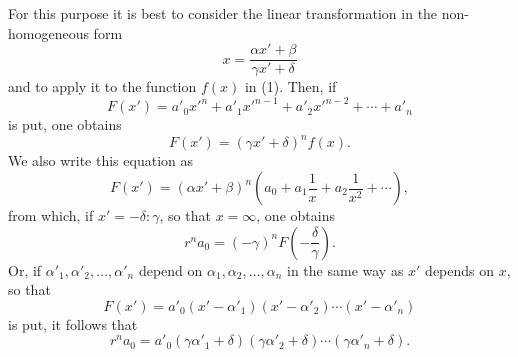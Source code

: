 \documentclass[11pt]{article}
\begin{document}
For this purpose it is best to consider the linear transformation in the non-homogeneous form
\begin{equation}
 x=\frac{\alpha x'+\beta}{\gamma x'+\delta}
\tag{15}
\end{equation}
and to apply it to the function $f(x)$ in (1). Then, if
\[
 F(x')=a'_0x'^n+a'_1x'^{n-1}+a'_2x'^{n-2}+\cdots+a'_n
\]
is put, one obtains
\begin{equation}
 F(x')=(\gamma x'+\delta)^n f(x).
\tag{16}
\end{equation}
We also write this equation as
\[
 F(x')=(\alpha x'+\beta)^n
 \left(a_0+a_1\frac1x+a_2\frac1{x^2}+\cdots\right),
\]
from which, if $x'=-\delta:\gamma$, so that $x=\infty$, one obtains
\[
 r^n a_0=(-\gamma)^n F\left(-\frac{\delta}{\gamma}\right).
\]
Or, if $\alpha'_1,\alpha'_2,\ldots,\alpha'_n$ depend on $\alpha_1,\alpha_2,\ldots,\alpha_n$ in the same way as $x'$ depends on $x$, so that
\[
 F(x')=a'_0(x'-\alpha'_1)(x'-\alpha'_2)\cdots(x'-\alpha'_n)
\]
is put, it follows that
\begin{equation}
 r^n a_0=a'_0(\gamma\alpha'_1+\delta)(\gamma\alpha'_2+\delta)\cdots(\gamma\alpha'_n+\delta).
\tag{17}
\end{equation}
\end{document}
